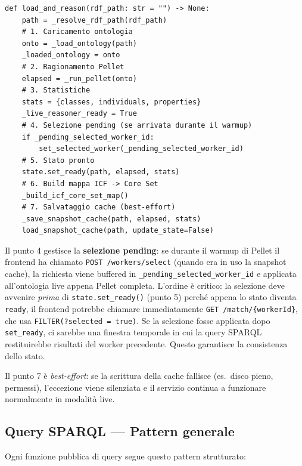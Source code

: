 \documentclass[a4paper,12pt]{article}
\begin{document}
\begin{lstlisting}[caption={Sequenza completa di \texttt{load\_and\_reason()}.}]
def load_and_reason(rdf_path: str = "") -> None:
    path = _resolve_rdf_path(rdf_path)
    # 1. Caricamento ontologia
    onto = _load_ontology(path)
    _loaded_ontology = onto
    # 2. Ragionamento Pellet
    elapsed = _run_pellet(onto)
    # 3. Statistiche
    stats = {classes, individuals, properties}
    _live_reasoner_ready = True
    # 4. Selezione pending (se arrivata durante il warmup)
    if _pending_selected_worker_id:
        set_selected_worker(_pending_selected_worker_id)
    # 5. Stato pronto
    state.set_ready(path, elapsed, stats)
    # 6. Build mappa ICF -> Core Set
    _build_icf_core_set_map()
    # 7. Salvataggio cache (best-effort)
    _save_snapshot_cache(path, elapsed, stats)
    load_snapshot_cache(path, update_state=False)
\end{lstlisting}

\noindent Il punto 4 gestisce la \textbf{selezione pending}: se durante il warmup
di Pellet il frontend ha chiamato \texttt{POST /workers/select} (quando
era in uso la snapshot cache), la richiesta viene buffered in
\texttt{\_\allowbreak{}pending\_\allowbreak{}selected\_\allowbreak{}worker\_\allowbreak{}id} e applicata all'ontologia live
appena Pellet completa. L'ordine \`{e} critico: la selezione deve avvenire
\textit{prima} di \texttt{state.set\_ready()} (punto 5) perch\'{e} appena
lo stato diventa \texttt{ready}, il frontend potrebbe chiamare immediatamente
\texttt{GET /match/\{workerId\}}, che usa \texttt{FILTER(?selected = true)}.
Se la selezione fosse applicata dopo \texttt{set\_ready}, ci sarebbe una
finestra temporale in cui la query SPARQL restituirebbe risultati del
worker precedente. Questo garantisce la consistenza dello stato.

Il punto 7 \`{e} \textit{best-effort}: se la scrittura della cache
fallisce (es.\ disco pieno, permessi), l'eccezione viene silenziata e
il servizio continua a funzionare normalmente in modalit\`{a} live.

\subsection{Query SPARQL --- Pattern generale}

Ogni funzione pubblica di query segue questo pattern strutturato:
\end{document}
